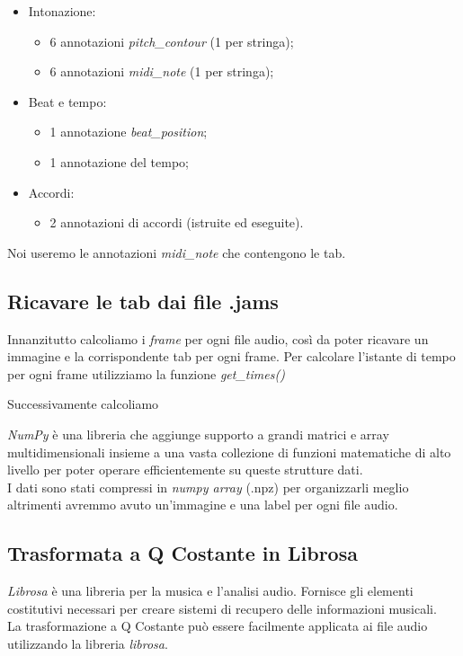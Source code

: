 \begin{itemize}
	\item Intonazione:
	\begin{itemize}
		\item 6 annotazioni \textit{pitch\_contour} (1 per stringa);
		\item 6 annotazioni \textit{midi\_note} (1 per stringa);
	\end{itemize}
	\item Beat e tempo:
	\begin{itemize}
		\item 1 annotazione \textit{beat\_position};
		\item 1 annotazione del tempo;
	\end{itemize}
	\item Accordi:
	\begin{itemize}
		\item 2 annotazioni di accordi (istruite ed eseguite).
	\end{itemize}
\end{itemize}
Noi useremo le annotazioni \textit{midi\_note} che contengono le tab.
\subsection{Ricavare le tab dai file .jams}
Innanzitutto calcoliamo i \textit{frame} per ogni file audio, così da poter ricavare un immagine e la corrispondente tab per ogni frame.
Per calcolare l'istante di tempo per ogni frame utilizziamo la funzione \textit{get_times()}

Successivamente calcoliamo 


\textit{NumPy} è una libreria che aggiunge supporto a grandi matrici e array multidimensionali insieme a una vasta collezione di funzioni matematiche di alto livello per poter operare efficientemente su queste strutture dati.\\
\newline
I dati sono stati compressi in \textit{numpy array} (.npz) per organizzarli meglio altrimenti avremmo avuto un'immagine e una label per ogni file audio.


\subsection{Trasformata a Q Costante in Librosa}
\textit{Librosa} è una libreria per la musica e l'analisi audio. Fornisce gli elementi costitutivi necessari per creare sistemi di recupero delle informazioni musicali.\\
\newline
La trasformazione a Q Costante può essere facilmente applicata ai file audio utilizzando la libreria \textit{librosa}.

